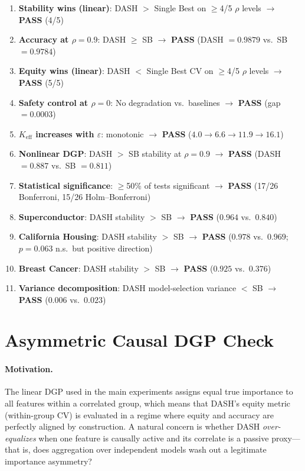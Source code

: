 \documentclass[10pt]{article}
\newcommand{\dash}{\textsc{DASH}}
\newcommand{\rhovar}{\rho}
\begin{document}
\begin{samepage}
\begin{enumerate}
  \item \textbf{Stability wins (linear)}: DASH $>$ Single Best on $\geq$4/5
    $\rhovar$ levels $\to$ \textbf{PASS} (4/5)
  \item \textbf{Accuracy at $\rhovar = 0.9$}: DASH $\geq$ SB $\to$
    \textbf{PASS} (DASH $= 0.9879$ vs.\ SB $= 0.9784$)
  \item \textbf{Equity wins (linear)}: DASH $<$ Single Best CV on $\geq$4/5
    $\rhovar$ levels $\to$ \textbf{PASS} (5/5)
  \item \textbf{Safety control at $\rhovar = 0$}: No degradation vs.\
    baselines $\to$ \textbf{PASS} (gap $= 0.0003$)
  \item \textbf{$K_{\text{eff}}$ increases with $\varepsilon$}: monotonic
    $\to$ \textbf{PASS} ($4.0 \to 6.6 \to 11.9 \to 16.1$)
  \item \textbf{Nonlinear DGP}: DASH $>$ SB stability at $\rhovar = 0.9$
    $\to$ \textbf{PASS} (DASH $= 0.887$ vs.\ SB $= 0.811$)
  \item \textbf{Statistical significance}: $\geq$50\% of tests significant
    $\to$ \textbf{PASS} (17/26 Bonferroni, 15/26 Holm--Bonferroni)
  \item \textbf{Superconductor}: DASH stability $>$ SB $\to$ \textbf{PASS}
    ($0.964$ vs.\ $0.840$)
  \item \textbf{California Housing}: DASH stability $>$ SB $\to$ \textbf{PASS}
    ($0.978$ vs.\ $0.969$; $p = 0.063$ n.s.\ but positive direction)
  \item \textbf{Breast Cancer}: DASH stability $>$ SB $\to$ \textbf{PASS}
    ($0.925$ vs.\ $0.376$)
  \item \textbf{Variance decomposition}: DASH model-selection variance $<$ SB
    $\to$ \textbf{PASS} ($0.006$ vs.\ $0.023$)
\end{enumerate}
\end{samepage}


\section{Asymmetric Causal DGP Check}
\label{app:asymmetric}

\paragraph{Motivation.}
The linear DGP used in the main experiments assigns equal true importance
to all features within a correlated group, which means that \dash{}'s
equity metric (within-group CV) is evaluated in a regime where equity
and accuracy are perfectly aligned by construction.
A natural concern is whether \dash{} \emph{over-equalizes} when one
feature is causally active and its correlate is a passive proxy---that
is, does aggregation over independent models wash out a legitimate
importance asymmetry?
\end{document}
